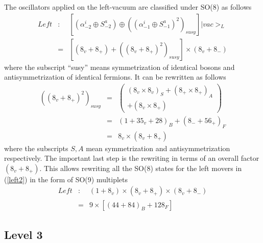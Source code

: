 The oscillators applied on the left-vacuum are classified under SO(8) as
follows
\begin{eqnarray}
{Left} &:&\left[ (\alpha _{-2}^i\oplus S_{-2}^a)\oplus \left( (\alpha
_{-1}^i\oplus S_{-1}^a)^2\right) _{susy}\right] |{vac}>_L  \label{left2}
\\
\  &=&\left[ (8_v+8_{+})+\left( (8_v+8_{+})^2\right) _{susy}\right] \times
(8_v+8_{-})  \nonumber
\end{eqnarray}
where the subscript ``susy'' means symmetrization of identical bosons and
antisymmetrization of identical fermions. It can be rewritten as follows
\begin{eqnarray}
\left( (8_v+8_{+})^2\right) _{susy} &=&\left(
\begin{array}{l}
\left( 8_v\times 8_v\right) _S+\left( 8_{+}\times 8_{+}\right) _A \\
+\left( 8_v\times 8_{+}\right)
\end{array}
\right)   \nonumber \\
\  &=&\left( 1+35_v+28\right) _B+\left( 8_{-}+56_{+}\right) _F
\label{similar} \\
\  &=&8_v\times \left( 8_v+8_{+}\right)   \nonumber
\end{eqnarray}
where the subscripts $S,A$ mean symmetrization and antisymmetrization
respectively. The important last step is the rewriting in terms of an
overall factor $\left( 8_v+8_{+}\right) .$ This allows rewriting all the
SO(8) states for the left movers in (\ref{left2}) in the form of SO(9)
multiplets
\begin{eqnarray}
{{{{Left }}}} &:&{{{\left( 1+8_v\right) \times \left( 8_v+8_{+}\right)
\times \left( 8_v+8_{-}\right) }}} \\
\  &=&{9\times \left[ \left( 44+84\right) _B+128_F\right] }  \nonumber
\end{eqnarray}

\subsection{Level 3}

